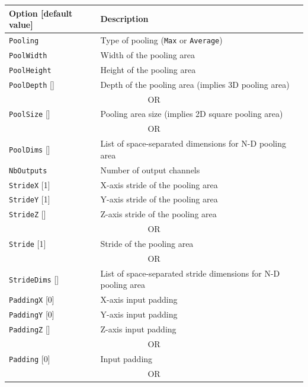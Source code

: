 \documentclass[a4paper,11pt,oneside]{article}
\begin{document}
\begin{center}
 \begin{longtable}{| p{5cm} | p{10cm} | }
 \hline
 Option [default value] & Description\\
 \hline\hline
  \cellcolor{requiredcolor}\lstinline!Pooling! & Type of pooling
  (\lstinline!Max! or \lstinline!Average!)\\
  \hline
  \cellcolor{requiredcolor}\lstinline!PoolWidth! & Width of the pooling area \\
  \cellcolor{requiredcolor}\lstinline!PoolHeight! & Height of the pooling area \\
  \lstinline!PoolDepth! [] & Depth of the pooling area (implies 3D pooling area) \\
  \multicolumn{2}{|c|}{\cellcolor{clrgray}\tiny OR} \\
  \cellcolor{requiredcolor}\lstinline!PoolSize! [] & Pooling area size (implies 2D square pooling area) \\
  \multicolumn{2}{|c|}{\cellcolor{clrgray}\tiny OR} \\
  \cellcolor{requiredcolor}\lstinline!PoolDims! [] & List of space-separated dimensions for N-D pooling area \\
  \hline
  \cellcolor{requiredcolor}\lstinline!NbOutputs! & Number of output channels \\
  \hline
  \lstinline!StrideX! [1] & X-axis stride of the pooling area \\
  \lstinline!StrideY! [1] & Y-axis stride of the pooling area \\
  \lstinline!StrideZ! [] & Z-axis stride of the pooling area \\
  \multicolumn{2}{|c|}{\cellcolor{clrgray}\tiny OR} \\
  \lstinline!Stride! [1] & Stride of the pooling area \\
  \multicolumn{2}{|c|}{\cellcolor{clrgray}\tiny OR} \\
  \lstinline!StrideDims! [] & List of space-separated stride dimensions for N-D pooling area \\
  \hline
  \lstinline!PaddingX! [0] & X-axis input padding \\
  \lstinline!PaddingY! [0] & Y-axis input padding \\
  \lstinline!PaddingZ! [] & Z-axis input padding \\
  \multicolumn{2}{|c|}{\cellcolor{clrgray}\tiny OR} \\
  \lstinline!Padding! [0] & Input padding \\
  \multicolumn{2}{|c|}{\cellcolor{clrgray}\tiny OR} \\

\end{longtable}
\end{center}
\end{document}
